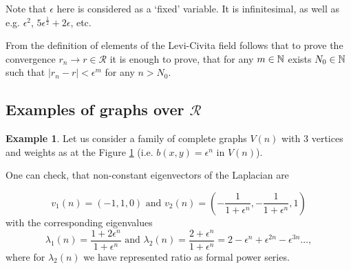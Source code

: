 \documentclass[a4paper,12pt]{amsart}
\theoremstyle{definition}
\newtheorem{example}{Example}
\newcommand{\R}{\mathcal{R}}
\begin{document}
Note that $\epsilon$ here is considered as a `fixed' variable. It is infinitesimal, as well as e.g. $\epsilon^2$, $5\epsilon^\frac{1}{2}+2\epsilon$, etc.

From the definition of elements of the Levi-Civita field follows that to prove the convergence $r_n\to r\in \R$ it is enough to prove, that for any $m\in \Bbb N$ exists $N_0\in \Bbb N$ such that
$|r_n- r|<\epsilon^m$ for any $n>N_0$.
\subsection{Examples of graphs over $\mathcal R$}
\begin{example}
Let us consider a family of complete graphs $V(n)$ with $3$ vertices and weights as at the Figure \ref{fig:example} (i.e. $b(x,y)=\epsilon^n$ in $V(n)$).


\begin{figure}[H]
\centering

%
%
%
%
%
%
%
\caption{}%
\label{fig:example}
\end{figure}
 One can check, that non-constant eigenvectors of the Laplacian are 

$$
v_1(n)=(-1,1,0) \mbox { and }
v_2(n)=\left(-\dfrac{1}{1+\epsilon^n},-\dfrac{1}{1+\epsilon^n},1\right)
$$
with the corresponding eigenvalues 
$$\lambda_1(n)=\dfrac{1+2\epsilon^n}{1+\epsilon^n} \mbox{ and }
\lambda_2(n)=\dfrac{2+\epsilon^n}{1+\epsilon^n}=2-\epsilon^n+\epsilon^{2n}-\epsilon^{3n}\dots,
$$
where for $\lambda_2(n)$ we have represented ratio as formal power series.


\end{example}
\end{document}
